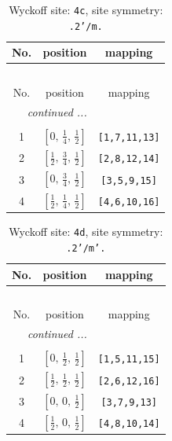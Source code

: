 \documentclass[fleqn,8pt]{jsarticle}
\begin{document}
\renewcommand{\arraystretch}{1.2}
\begin{longtable}{ccc}
\caption{Wyckoff site: {\tt 4c}, site symmetry: {\tt .2'/m.}}
 \\
 \hline \hline
No. & position & mapping \\ \hline \endfirsthead

\multicolumn{2}{l}{\tablename\ \thetable{}} \\
 \hline \hline
No. & position & mapping \\ \hline \endhead

 \hline \hline
\multicolumn{2}{r}{\footnotesize\it continued ...} \\ \endfoot

 \hline \hline
\multicolumn{2}{r}{} \\ \endlastfoot

1 & $\left[ 0,\, \frac{1}{4},\, \frac{1}{2} \right]$ & {\tt [1,7,11,13]} \\ \hline
2 & $\left[ \frac{1}{2},\, \frac{3}{4},\, \frac{1}{2} \right]$ & {\tt [2,8,12,14]} \\ \hline
3 & $\left[ 0,\, \frac{3}{4},\, \frac{1}{2} \right]$ & {\tt [3,5,9,15]} \\ \hline
4 & $\left[ \frac{1}{2},\, \frac{1}{4},\, \frac{1}{2} \right]$ & {\tt [4,6,10,16]} \\
\end{longtable}
\renewcommand{\arraystretch}{1.2}
\begin{longtable}{ccc}
\caption{Wyckoff site: {\tt 4d}, site symmetry: {\tt .2'/m'.}}
 \\
 \hline \hline
No. & position & mapping \\ \hline \endfirsthead

\multicolumn{2}{l}{\tablename\ \thetable{}} \\
 \hline \hline
No. & position & mapping \\ \hline \endhead

 \hline \hline
\multicolumn{2}{r}{\footnotesize\it continued ...} \\ \endfoot

 \hline \hline
\multicolumn{2}{r}{} \\ \endlastfoot

1 & $\left[ 0,\, \frac{1}{2},\, \frac{1}{2} \right]$ & {\tt [1,5,11,15]} \\ \hline
2 & $\left[ \frac{1}{2},\, \frac{1}{2},\, \frac{1}{2} \right]$ & {\tt [2,6,12,16]} \\ \hline
3 & $\left[ 0,\, 0,\, \frac{1}{2} \right]$ & {\tt [3,7,9,13]} \\ \hline
4 & $\left[ \frac{1}{2},\, 0,\, \frac{1}{2} \right]$ & {\tt [4,8,10,14]} \\
\end{longtable}
\end{document}
